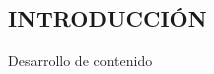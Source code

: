 \medspace
\vspace{1.5cm}
\begin{center}
	\section*{\large INTRODUCCIÓN}
\end{center}

\vspace{1cm}

Desarrollo de contenido